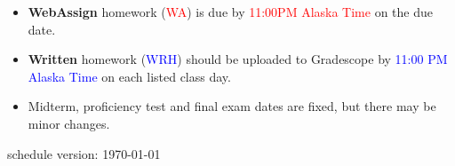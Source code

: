 \documentclass[12pt]{article}
\begin{document}
\begin{itemize}
\item \textbf{WebAssign} homework (\textcolor{red}{WA}) is due by \textcolor{red}{11:00PM Alaska Time} on the due date.
\item \textbf{Written} homework (\textcolor{blue}{WRH}) should be uploaded to Gradescope by \textcolor{blue}{11:00 PM Alaska Time} on each listed class day.
\item Midterm, proficiency test and final exam dates are fixed, but there may be minor changes.
\end{itemize}




\vfill
\hfill \scriptsize schedule version: \today \normalsize
\end{document}
